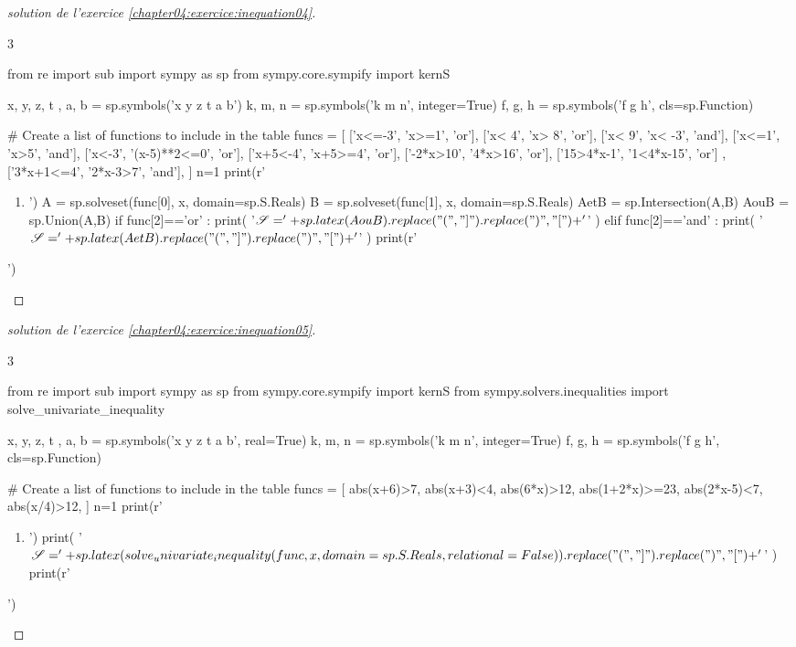 \documentclass[main.tex]{subfiles}
\begin{document}
\begin{proof}[solution de l'exercice  \ref{chapter04:exercice:inequation04}] \hfill
	\vspace{-0.75em}  
\begin{multicols}{3} 
\begin{pycode} 
from re import sub
import sympy as sp
from sympy.core.sympify import kernS

x, y, z, t , a, b = sp.symbols('x y z t a b')
k, m, n = sp.symbols('k m n', integer=True)
f, g, h = sp.symbols('f g h', cls=sp.Function)

# Create a list of functions to include in the table
funcs = [
['x<=-3', 'x>=1', 'or'],
['x< 4', 'x> 8', 'or'],
['x< 9', 'x< -3', 'and'],
['x<=1', 'x>5', 'and'],
['x<-3', '(x-5)**2<=0', 'or'],
['x+5<-4', 'x+5>=4', 'or'],
['-2*x>10', '4*x>16', 'or'],
['15>4*x-1', '1<4*x-15', 'or'] ,
['3*x+1<=4', '2*x-3>7', 'and'], 
]
n=1
print(r'\begin{enumerate}[label={$(I_{\arabic*})$}] ')
for func in funcs:
	print('\item ')
	A = sp.solveset(func[0],   x,   domain=sp.S.Reals)
	B = sp.solveset(func[1],   x,   domain=sp.S.Reals)
	AetB = sp.Intersection(A,B)
	AouB = sp.Union(A,B)
	if func[2]=='or' :
		print( '$\mathscr{S} =' + sp.latex(AouB).replace("(", "]").replace(")", "[")   + '$'     )
	elif func[2]=='and' :
		print( '$\mathscr{S} =' + sp.latex(AetB).replace("(", "]").replace(")", "[")   + '$'     )
print(r'\end{enumerate} ')
\end{pycode}
\end{multicols}
\scriptsize 
\end{proof} 
\vspace{-1em}
\begin{proof} [solution de l'exercice  \ref{chapter04:exercice:inequation05}]\hfill 
	\vspace{-0.5em}
\begin{multicols}{3} 
\begin{pycode}
from re import sub
import sympy as sp
from sympy.core.sympify import kernS
from sympy.solvers.inequalities import solve_univariate_inequality

x, y, z, t , a, b = sp.symbols('x y z t a b', real=True)
k, m, n = sp.symbols('k m n', integer=True)
f, g, h = sp.symbols('f g h', cls=sp.Function)

# Create a list of functions to include in the table
funcs = [
abs(x+6)>7, 
abs(x+3)<4, 
abs(6*x)>12, 
abs(1+2*x)>=23, 
abs(2*x-5)<7, 
abs(x/4)>12,  
]
n=1
print(r'\begin{enumerate}[label={$(I_{\arabic*})$}] ')
for func in funcs:
	print('\item ')
	print( '$\mathscr{S} = ' + sp.latex(solve_univariate_inequality(func,   x,   domain=sp.S.Reals, relational=False)).replace("(", "]").replace(")", "[")   + '$'     )
print(r'\end{enumerate}  ')
\end{pycode}
\end{multicols}	
\scriptsize
\end{proof} 
\end{document}
